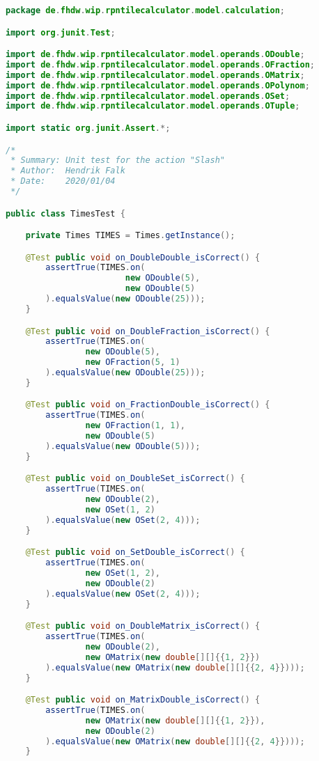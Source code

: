 \begin{lstlisting}[caption=TimesTest (Schwenke),label=list:TimesTest,language=Java]
package de.fhdw.wip.rpntilecalculator.model.calculation;

import org.junit.Test;

import de.fhdw.wip.rpntilecalculator.model.operands.ODouble;
import de.fhdw.wip.rpntilecalculator.model.operands.OFraction;
import de.fhdw.wip.rpntilecalculator.model.operands.OMatrix;
import de.fhdw.wip.rpntilecalculator.model.operands.OPolynom;
import de.fhdw.wip.rpntilecalculator.model.operands.OSet;
import de.fhdw.wip.rpntilecalculator.model.operands.OTuple;

import static org.junit.Assert.*;

/*
 * Summary: Unit test for the action "Slash"
 * Author:  Hendrik Falk
 * Date:    2020/01/04
 */

public class TimesTest {

    private Times TIMES = Times.getInstance();

    @Test public void on_DoubleDouble_isCorrect() {
        assertTrue(TIMES.on(
                        new ODouble(5),
                        new ODouble(5)
        ).equalsValue(new ODouble(25)));
    }

    @Test public void on_DoubleFraction_isCorrect() {
        assertTrue(TIMES.on(
                new ODouble(5),
                new OFraction(5, 1)
        ).equalsValue(new ODouble(25)));
    }

    @Test public void on_FractionDouble_isCorrect() {
        assertTrue(TIMES.on(
                new OFraction(1, 1),
                new ODouble(5)
        ).equalsValue(new ODouble(5)));
    }

    @Test public void on_DoubleSet_isCorrect() {
        assertTrue(TIMES.on(
                new ODouble(2),
                new OSet(1, 2)
        ).equalsValue(new OSet(2, 4)));
    }

    @Test public void on_SetDouble_isCorrect() {
        assertTrue(TIMES.on(
                new OSet(1, 2),
                new ODouble(2)
        ).equalsValue(new OSet(2, 4)));
    }

    @Test public void on_DoubleMatrix_isCorrect() {
        assertTrue(TIMES.on(
                new ODouble(2),
                new OMatrix(new double[][]{{1, 2}})
        ).equalsValue(new OMatrix(new double[][]{{2, 4}})));
    }

    @Test public void on_MatrixDouble_isCorrect() {
        assertTrue(TIMES.on(
                new OMatrix(new double[][]{{1, 2}}),
                new ODouble(2)
        ).equalsValue(new OMatrix(new double[][]{{2, 4}})));
    }


\end{lstlisting}
